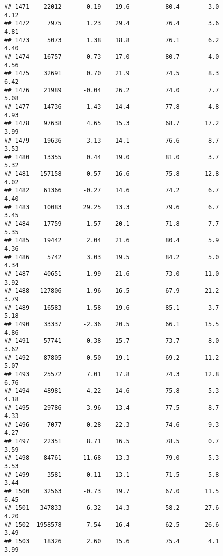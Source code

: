 \documentclass[
]{article}
\begin{document}
\begin{verbatim}
## 1471    22012       0.19    19.6          80.4        3.0              4.12
## 1472     7975       1.23    29.4          76.4        3.6              4.81
## 1473     5073       1.38    18.8          76.1        6.2              4.40
## 1474    16757       0.73    17.0          80.7        4.0              4.56
## 1475    32691       0.70    21.9          74.5        8.3              6.42
## 1476    21989      -0.04    26.2          74.0        7.7              5.08
## 1477    14736       1.43    14.4          77.8        4.8              4.93
## 1478    97638       4.65    15.3          68.7       17.2              3.99
## 1479    19636       3.13    14.1          76.6        8.7              3.53
## 1480    13355       0.44    19.0          81.0        3.7              5.32
## 1481   157158       0.57    16.6          75.8       12.8              4.02
## 1482    61366      -0.27    14.6          74.2        6.7              4.40
## 1483    10083      29.25    13.3          79.6        6.7              3.45
## 1484    17759      -1.57    20.1          71.8        7.7              5.35
## 1485    19442       2.04    21.6          80.4        5.9              4.36
## 1486     5742       3.03    19.5          84.2        5.0              4.34
## 1487    40651       1.99    21.6          73.0       11.0              3.92
## 1488   127806       1.96    16.5          67.9       21.2              3.79
## 1489    16583      -1.58    19.6          85.1        3.7              5.18
## 1490    33337      -2.36    20.5          66.1       15.5              4.86
## 1491    57741      -0.38    15.7          73.7        8.0              3.62
## 1492    87805       0.50    19.1          69.2       11.2              5.07
## 1493    25572       7.01    17.8          74.3       12.8              6.76
## 1494    48981       4.22    14.6          75.8        5.3              4.18
## 1495    29786       3.96    13.4          77.5        8.7              4.33
## 1496     7077      -0.28    22.3          74.6        9.3              4.27
## 1497    22351       8.71    16.5          78.5        0.7              3.59
## 1498    84761      11.68    13.3          79.0        5.3              3.53
## 1499     3581       0.11    13.1          71.5        5.8              3.44
## 1500    32563      -0.73    19.7          67.0       11.5              6.45
## 1501   347833       6.32    14.3          58.2       27.6              4.20
## 1502  1958578       7.54    16.4          62.5       26.6              3.49
## 1503    18326       2.60    15.6          75.4        4.1              3.99

\end{verbatim}
\end{document}
